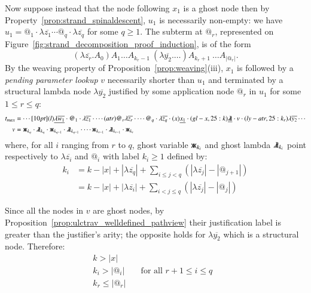 \documentclass{elsarticle}
\theoremstyle{plain}
\theoremstyle{definition}
\newcommand{\ghostlmd}{{\lambda\mkern-7mu \lambda}}
\newcommand{\ghostvar}{\mathsf{x\mkern-5mu x}}
\begin{document}
\begin{enumerate}
Now suppose instead that the node following $x_1$ is a ghost node then by Property~\ref{prop:strand_spinaldescent}, $u_1$ is necessarily non-empty: we have $u_1 =
@_1 \cdot\lambda\overline{z_1} \cdots @_q\cdot \lambda\overline{z_q}$ for some $q\geq 1$. The subterm at $@_r$,  represented on Figure~\ref{fig:strand_decomposition_proof_induction}, is of the form
$$(\lambda\overline{z_r}. A_0) A_1 \ldots A_{k_{r}-1}\ (\lambda\overline{y_2}. \ldots)A_{k_{r}+1}\ \ldots A_{|@_r|} .$$
By the weaving property of Proposition~\ref{prop:weaving}(iii), $x_1$ is followed by a \emph{pending parameter lookup} $v$ necessarily shorter than $u_1$ and terminated by a structural lambda node $\lambda\overline{y_2}$ justified by some application node $@_r$ in $u_1$ for some $1\leq r \leq q$:
\begin{align*}
 t_{max} &= \cdots \Pstr[10pt]{
(l){\underline{\lambda\overline{w_1}}} \cdot
{@_1} \cdot \lambda\overline{z_1} \cdot
\cdots
(atr){@_r} \lambda\overline{z_r} \cdot
\cdots
{@_q} \cdot\lambda\overline{z_q} \cdot
(x){\underline{x_1}}\cdot
(gl-x,25:k){\underline\ghostlmd}
\cdot v
\cdot
(ly-atr,25:k_r){\lambda\overline{y_2}}
\cdots
 } \\
v &= \ghostvar_{k_q} \cdot \ghostlmd_{k_q} \cdot
\ghostvar_{k_{q-1}} \cdot \ghostlmd_{k_{q-1}} \cdot
\cdots
\ghostvar_{k_{r-1}} \cdot \ghostlmd_{k_{r-1}} \cdot
\ghostvar_{k_{r}}
\end{align*}
where, for all $i$ ranging from $r$ to $q$, ghost variable
$\ghostvar_{k_i}$ and ghost lambda $\ghostlmd_{k_i}$ point respectively to $\lambda\overline{z_i}$ and $@_i$ with label $k_i\geq1$ defined by:
\begin{align*}
  k_i &= k - |x| + |\lambda\overline{z_q}| + \sum_{i\leq j < q} (|\lambda\overline{z_j}| - |@_{j+1}|)
\\
   &= k - |x| +
  |\lambda\overline{z_i}| +
  \sum_{i< j\leq q} (|\lambda\overline{z_j}| - |@_j|)
\end{align*}

Since all the nodes in $v$ are ghost nodes, by Proposition~\ref{prop:ulctrav_welldefined_pathview} their justification label is greater than the justifier's arity; the opposite holds for $\lambda\overline{y_2}$ which is a structural node. Therefore:
\begin{align}
k > |x| \label{eqn:k_greater_than_x} \\
k_i > |@_i| & \quad\mbox{for all $r+1\leq i \leq q$ } \label{eqn:qnfdecomp_kj}\\
k_r \leq |@_r|
\end{align}



\end{enumerate}
\end{document}
